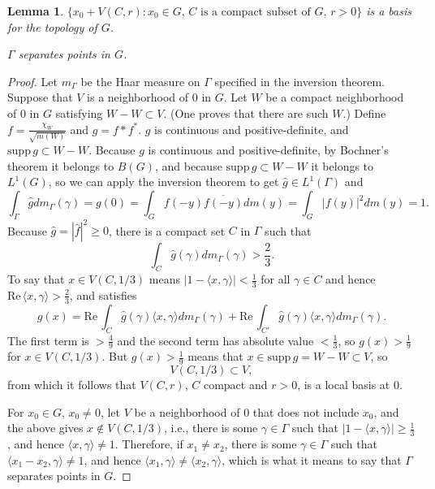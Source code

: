 \documentclass{article}
\newcommand{\inner}[2]{\langle #1, #2 \rangle}
\def\Re{\ensuremath{\mathrm{Re}}\,}
\newcommand{\supp}{\mathrm{supp}\,}
\newtheorem{lemma}[theorem]{Lemma}
\begin{document}
\begin{lemma}
$\{x_0+V(C,r): \textrm{$x_0 \in G$, $C$ is a compact subset of $G$, $r>0$}\}$ is a basis for the topology of $G$.

$\Gamma$ separates points in $G$.
\label{VCr}
\end{lemma}
\begin{proof}
Let $m_\Gamma$ be the Haar measure on $\Gamma$ specified in the inversion theorem.
Suppose that $V$ is a neighborhood of $0$ in $G$. Let $W$ be a compact neighborhood of $0$ in $G$ satisfying $W-W \subset V$. (One proves
that there are such $W$.) Define $f=\frac{\chi_W}{\sqrt{m(W)}}$ and $g=f*f^*$. $g$ is continuous and positive-definite,
and $\supp g \subset  W - W$. Because $g$ is continuous and positive-definite, by Bochner's theorem it belongs to $B(G)$,
and because $\supp g \subset W-W$ it belongs to $L^1(G)$, so we can apply the inversion theorem to get $\hat{g} \in L^1(\Gamma)$ and
\[
\int_\Gamma \hat{g} dm_\Gamma(\gamma) = g(0) = \int_G f(-y) \overline{f(-y)} dm(y) = \int_G |f(y)|^2 dm(y) = 1.
\]
Because $\hat{g}=|\hat{f}|^2 \geq 0$, there is a compact set $C$ in $\Gamma$ such that
\[
\int_C \hat{g}(\gamma) dm_\Gamma(\gamma) > \frac{2}{3}.
\]
To say that $x \in V(C,1/3)$ means $|1-\inner{x}{\gamma}|<\frac{1}{3}$ for all $\gamma \in  C$ and hence $\Re \inner{x}{\gamma}>\frac{2}{3}$,
and satisfies
\[
g(x) = \Re \int_C \hat{g}(\gamma) \inner{x}{\gamma} dm_\Gamma(\gamma) + \Re \int_{C'} \hat{g}(\gamma) \inner{x}{\gamma} dm_\Gamma(\gamma).
\]
The first term is $>\frac{4}{9}$ and the second term has absolute value $<\frac{1}{3}$, so $g(x)>\frac{1}{9}$ for $x \in V(C,1/3)$. 
But $g(x)>\frac{1}{9}$ means that $x \in \supp g = W-W \subset V$, so
\[
V(C,1/3) \subset V,
\]
from which it follows that $V(C,r)$, $C$ compact and $r>0$, is a local basis at $0$.

For $x_0 \in G$, $x_0 \neq 0$, let $V$ be a neighborhood of $0$ that does not include $x_0$,
and the above gives $x \not \in V(C,1/3)$, i.e., there is some $\gamma \in \Gamma$ such that $|1-\inner{x}{\gamma}| \geq \frac{1}{3}$,
and hence $\inner{x}{\gamma} \neq 1$. Therefore, if $x_1 \neq x_2$, there is some $\gamma \in \Gamma$ such that $\inner{x_1-x_2}{\gamma} \neq 1$,
and hence $\inner{x_1}{\gamma} \neq \inner{x_2}{\gamma}$, which is what it means to say that $\Gamma$ separates points in $G$.
\end{proof}
\end{document}
